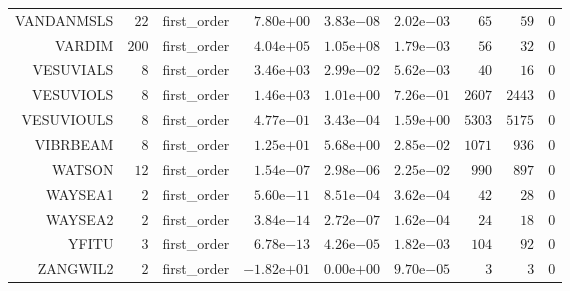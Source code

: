 \begin{longtable}{rrrrrrrrr}
VANDANMSLS & \(    22\) & first\_order & \( 7.80\)e\(+00\) & \( 3.83\)e\(-08\) & \( 2.02\)e\(-03\) & \(    65\) & \(    59\) & \(     0\) \\
VARDIM & \(   200\) & first\_order & \( 4.04\)e\(+05\) & \( 1.05\)e\(+08\) & \( 1.79\)e\(-03\) & \(    56\) & \(    32\) & \(     0\) \\
VESUVIALS & \(     8\) & first\_order & \( 3.46\)e\(+03\) & \( 2.99\)e\(-02\) & \( 5.62\)e\(-03\) & \(    40\) & \(    16\) & \(     0\) \\
VESUVIOLS & \(     8\) & first\_order & \( 1.46\)e\(+03\) & \( 1.01\)e\(+00\) & \( 7.26\)e\(-01\) & \(  2607\) & \(  2443\) & \(     0\) \\
VESUVIOULS & \(     8\) & first\_order & \( 4.77\)e\(-01\) & \( 3.43\)e\(-04\) & \( 1.59\)e\(+00\) & \(  5303\) & \(  5175\) & \(     0\) \\
VIBRBEAM & \(     8\) & first\_order & \( 1.25\)e\(+01\) & \( 5.68\)e\(+00\) & \( 2.85\)e\(-02\) & \(  1071\) & \(   936\) & \(     0\) \\
WATSON & \(    12\) & first\_order & \( 1.54\)e\(-07\) & \( 2.98\)e\(-06\) & \( 2.25\)e\(-02\) & \(   990\) & \(   897\) & \(     0\) \\
WAYSEA1 & \(     2\) & first\_order & \( 5.60\)e\(-11\) & \( 8.51\)e\(-04\) & \( 3.62\)e\(-04\) & \(    42\) & \(    28\) & \(     0\) \\
WAYSEA2 & \(     2\) & first\_order & \( 3.84\)e\(-14\) & \( 2.72\)e\(-07\) & \( 1.62\)e\(-04\) & \(    24\) & \(    18\) & \(     0\) \\
YFITU & \(     3\) & first\_order & \( 6.78\)e\(-13\) & \( 4.26\)e\(-05\) & \( 1.82\)e\(-03\) & \(   104\) & \(    92\) & \(     0\) \\
ZANGWIL2 & \(     2\) & first\_order & \(-1.82\)e\(+01\) & \( 0.00\)e\(+00\) & \( 9.70\)e\(-05\) & \(     3\) & \(     3\) & \(     0\) \\\hline
\end{longtable}
